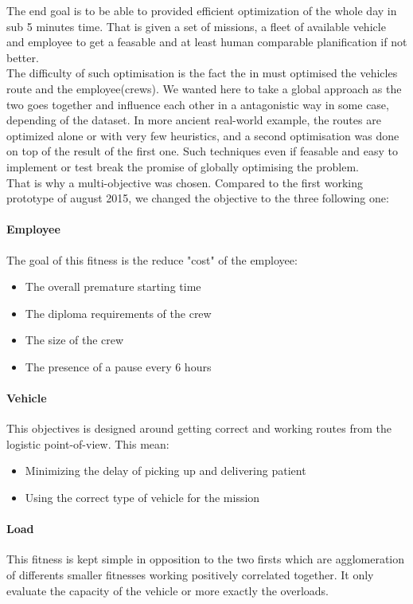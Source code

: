 \documentclass[12pt]{memoir}
\begin{document}
The end goal is to be able to provided efficient optimization of the whole day in
sub 5 minutes time. That is given a set of missions, a fleet of available vehicle
and employee to get a feasable and at least human comparable planification if not
better. \\
The difficulty of such optimisation is the fact the in must optimised the vehicles
route and the employee(crews). We wanted here to take a global approach as the two
goes together and influence each other in a antagonistic way in some case, depending
of the dataset. In more ancient real-world example, the routes are optimized alone
or with very few heuristics, and a second optimisation was done on top of the result
of the first one. Such techniques even if feasable and easy to implement or test
break the promise of globally optimising the problem.\\
That is  why a multi-objective was chosen. Compared to the first working prototype
of august 2015, we changed the objective to the three following one:

\paragraph{Employee} %
\label{par:Employee}
The goal of this fitness is the reduce "cost" of the employee:
\begin{itemize}
  \item The overall premature starting time
  \item The diploma requirements of the crew
  \item The size of the crew
  \item The presence of a pause every 6 hours
\end{itemize}

\paragraph{Vehicle} %
\label{par:Vehicle}
This objectives is designed around getting correct and working routes from the
logistic point-of-view. This mean:
\begin{itemize}
  \item Minimizing the delay of picking up and delivering patient
  \item Using the correct type of vehicle for the mission
\end{itemize}

\paragraph{Load} %
This fitness is kept simple in opposition to the two firsts which are agglomeration
of differents smaller fitnesses working positively correlated together. It only
evaluate the capacity of the vehicle or more exactly the overloads.
\label{par:Load}
\end{document}
